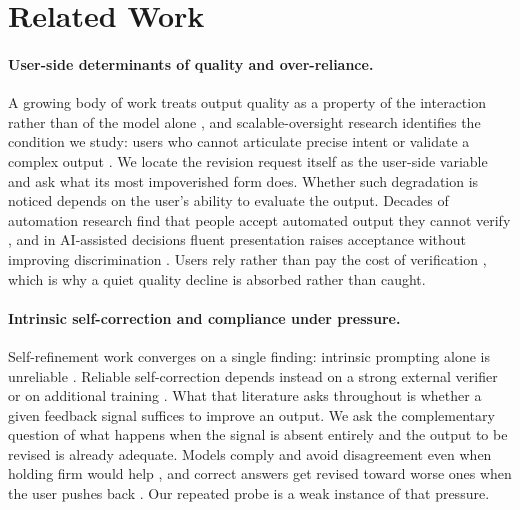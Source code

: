\section{Related Work}


\paragraph{User-side determinants of quality and over-reliance.}
A growing body of work treats output quality as a property of the interaction rather than
of the model alone \cite{laban2025lost, yang2025underspecification}, and scalable-oversight
research identifies the condition we study: users who cannot articulate precise intent or
validate a complex output \cite{zhou2026oversight}. We locate the revision request itself
as the user-side variable and ask what its most impoverished form does.
Whether such degradation is noticed depends on the user's ability to evaluate the output.
Decades of automation research find that people accept automated output they cannot verify
\cite{skitka1999automation, parasuraman2010complacency}, and in AI-assisted decisions
fluent presentation raises acceptance without improving discrimination
\cite{bansal2021whole, bucinca2021trust}. Users rely rather than pay the cost of
verification \cite{vasconcelos2023explanations}, which is why a quiet
quality decline is absorbed rather than caught.

\paragraph{Intrinsic self-correction and compliance under pressure.}
Self-refinement work converges on a single finding: intrinsic prompting alone is
unreliable \cite{madaan2024self, huang2024large, kamoi2024selfcorrection, tyen2024llms}.
Reliable self-correction depends instead on a strong external verifier or on additional
training \cite{zhang2024small, qu2024recursive, shinn2023reflexion}. What that literature
asks throughout is whether a given feedback signal suffices to improve an output. We ask
the complementary question of what happens when the signal is absent entirely and the
output to be revised is already adequate.
Models comply and avoid disagreement even when holding firm would help
\cite{perez2023discovering, sharma2024towards, wei2024simple, openai2025sycophancy}, and
correct answers get revised toward worse ones when the user pushes back
\cite{xu2024earth, fanous2025syceval}. Our repeated probe is a weak instance of that
pressure.

